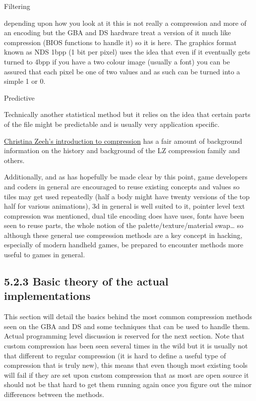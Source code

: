 \documentclass[
]{book}
\begin{document}
Filtering

depending upon how you look at it this is not really a compression and more of an encoding but the GBA and DS hardware treat a version of it much like compression (BIOS functions to handle it) so it is here. The graphics format known as NDS 1bpp (1 bit per pixel) uses the idea that even if it eventually gets turned to 4bpp if you have a two colour image (usually a font) you can be assured that each pixel be one of two values and as such can be turned into a simple 1 or 0.

Predictive

Technically another statistical method but it relies on the idea that certain parts of the file might be predictable and is usually very application specific.

\href{https://ece.uwaterloo.ca/~ece611/LempelZiv.pdf}{Christina Zeeh's introduction to compression} has a fair amount of background information on the history and background of the LZ compression family and others.

Additionally, and as has hopefully be made clear by this point, game developers and coders in general are encouraged to reuse existing concepts and values so tiles may get used repeatedly (half a body might have twenty versions of the top half for various animations), 3d in general is well suited to it, pointer level text compression was mentioned, dual tile encoding does have uses, fonts have been seen to reuse parts, the whole notion of the palette/texture/material swap\ldots{} so although these general use compression methods are a key concept in hacking, especially of modern handheld games, be prepared to encounter methods more useful to games in general.

\hypertarget{basic-theory-of-the-actual-implementations}{%
\subsection{5.2.3 Basic theory of the actual implementations}\label{basic-theory-of-the-actual-implementations}}

This section will detail the basics behind the most common compression methods seen on the GBA and DS and some techniques that can be used to handle them. Actual programming level discussion is reserved for the next section. Note that custom compression has been seen several times in the wild but it is usually not that different to regular compression (it is hard to define a useful type of compression that is truly new), this means that even though most existing tools will fail if they are set upon custom compression that as most are open source it should not be that hard to get them running again once you figure out the minor differences between the methods.
\end{document}
